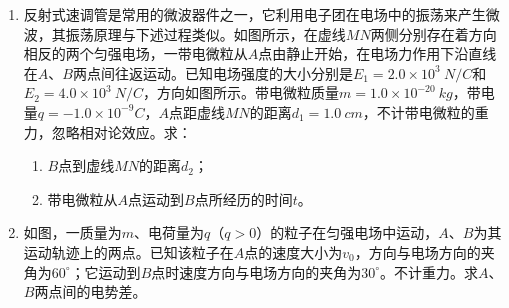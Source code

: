 \begin{enumerate}[leftmargin=0em]
\newpage
\item
{}
反射式速调管是常用的微波器件之一，它利用电子团在电场中的振荡来产生微波，其振荡原理与下述过程类似。如图所示，在虚线$ MN $两侧分别存在着方向相反的两个匀强电场，一带电微粒从$ A $点由静止开始，在电场力作用下沿直线在$ A $、$ B $两点间往返运动。已知电场强度的大小分别是$ E_{1} =2.0 \times 10^3 \ N/C $和$ E_{2} =4.0 \times 10^3 \ N/C $，方向如图所示。带电微粒质量$ m=1.0 \times 10^{-20 }\ kg $，带电量$ q=-1.0 \times 10^{-9}C $，$ A $点距虚线$ MN $的距离$ d_1=1.0 \ cm $，不计带电微粒的重力，忽略相对论效应。求：
\begin{enumerate}
\renewcommand{\labelenumi}{\arabic{enumi}.}
\item
$ B $点到虚线$ MN $的距离$ d_{2} $；
\item 
带电微粒从$ A $点运动到$ B $点所经历的时间$ t $。



\end{enumerate}
\begin{figure}[h!]
\flushright

\end{figure}



\item
{}
如图，一质量为$ m $、电荷量为$ q $（$ q>0 $）的粒子在匀强电场中运动，$ A $、$ B $为其运动轨迹上的两点。已知该粒子在$ A $点的速度大小为$ v_{0} $，方向与电场方向的夹角为$ 60 ^{ \circ } $；它运动到$ B $点时速度方向与电场方向的夹角为$ 30 ^{ \circ } $。不计重力。求$ A $、$ B $两点间的电势差。
\begin{figure}[h!]
\flushright

\end{figure}



\end{enumerate}
